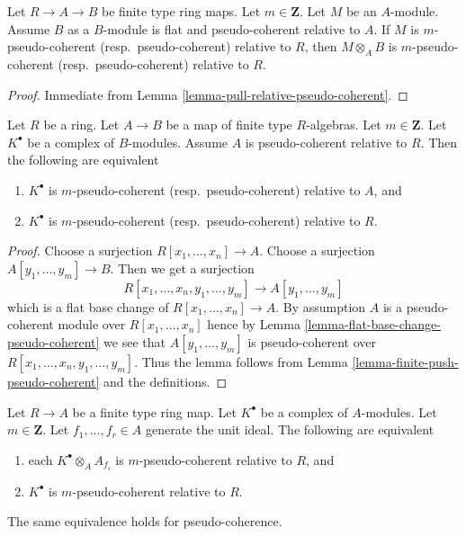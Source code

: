 \begin{lemma}
\label{lemma-pull-relative-pseudo-coherent-module}
Let $R \to A \to B$ be finite type ring maps.
Let $m \in \mathbf{Z}$. Let $M$ be an $A$-module.
Assume $B$ as a $B$-module is flat and pseudo-coherent relative to $A$.
If $M$ is $m$-pseudo-coherent (resp.\ pseudo-coherent)
relative to $R$, then $M \otimes_A B$ is
$m$-pseudo-coherent (resp.\ pseudo-coherent) relative to $R$.
\end{lemma}

\begin{proof}
Immediate from
Lemma \ref{lemma-pull-relative-pseudo-coherent}.
\end{proof}

\begin{lemma}
\label{lemma-composition-relative-pseudo-coherent}
Let $R$ be a ring. Let $A \to B$ be a map of finite type $R$-algebras.
Let $m \in \mathbf{Z}$. Let $K^\bullet$ be a complex of $B$-modules.
Assume $A$ is pseudo-coherent relative to $R$. Then the following are
equivalent
\begin{enumerate}
\item $K^\bullet$ is $m$-pseudo-coherent (resp.\ pseudo-coherent)
relative to $A$, and
\item $K^\bullet$ is $m$-pseudo-coherent (resp.\ pseudo-coherent)
relative to $R$.
\end{enumerate}
\end{lemma}

\begin{proof}
Choose a surjection $R[x_1, \ldots, x_n] \to A$.
Choose a surjection $A[y_1, \ldots, y_m] \to B$.
Then we get a surjection
$$
R[x_1, \ldots, x_n, y_1, \ldots, y_m] \to A[y_1, \ldots, y_m]
$$
which is a flat base change of $R[x_1, \ldots, x_n] \to A$.
By assumption $A$ is a pseudo-coherent module over $R[x_1, \ldots, x_n]$
hence by
Lemma \ref{lemma-flat-base-change-pseudo-coherent}
we see that $A[y_1, \ldots, y_m]$ is pseudo-coherent over
$R[x_1, \ldots, x_n, y_1, \ldots, y_m]$. Thus the lemma follows from
Lemma \ref{lemma-finite-push-pseudo-coherent}
and the definitions.
\end{proof}

\begin{lemma}
\label{lemma-glue-relative-pseudo-coherent}
Let $R \to A$ be a finite type ring map.
Let $K^\bullet$ be a complex of $A$-modules.
Let $m \in \mathbf{Z}$.
Let $f_1, \ldots, f_r \in A$ generate the unit ideal.
The following are equivalent
\begin{enumerate}
\item each $K^\bullet \otimes_A A_{f_i}$ is
$m$-pseudo-coherent relative to $R$, and
\item $K^\bullet$ is $m$-pseudo-coherent relative to $R$.
\end{enumerate}
The same equivalence holds for pseudo-coherence.
\end{lemma}

